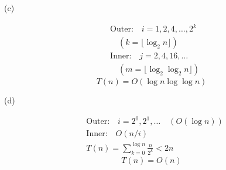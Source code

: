 \documentclass[11pt]{article}
\begin{document}
\vspace{1em}

\noindent
\begin{minipage}[t]{0.04\textwidth}
\vspace{0pt}
(c)
\end{minipage}%
\begin{minipage}[t]{0.50\textwidth}
\vspace{0pt}
\begin{algorithm}[H]
\DontPrintSemicolon
{}
\end{algorithm}
\end{minipage}%
\begin{minipage}[t]{0.46\textwidth}
\vspace{0pt}
\begin{align*}
&\text{Outer:} \quad i = 1, 2, 4, \ldots, 2^k \\
&\quad (k = \lfloor \log_2 n \rfloor) \\
&\text{Inner:} \quad j = 2, 4, 16, \ldots \\
&\quad (m = \lfloor \log_2 \log_2 n \rfloor)
\end{align*}
\[
\boxed{T(n) = O(\log n \log \log n)}
\]
\end{minipage}

\vspace{1em}

\noindent
\begin{minipage}[t]{0.04\textwidth}
\vspace{0pt}
(d)
\end{minipage}%
\begin{minipage}[t]{0.50\textwidth}
\vspace{0pt}
\begin{algorithm}[H]
\DontPrintSemicolon
{}
\end{algorithm}
\end{minipage}%
\begin{minipage}[t]{0.46\textwidth}
\vspace{0pt}
\begin{align*}
&\text{Outer:} \quad i = 2^0, 2^1, \ldots \quad (O(\log n)) \\
&\text{Inner:} \quad O(n/i) \\
&T(n) = \sum_{k=0}^{\log n} \frac{n}{2^k} < 2n
\end{align*}
\[
\boxed{T(n) = O(n)}
\]
\end{minipage}
\end{document}
